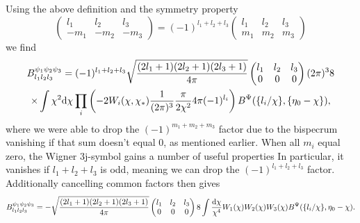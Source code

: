\documentclass[11pt]{article} %
\DeclareRobustCommand{\d}{\ifmmode\text{d}\else d\fi}
\newcommand{\br}[1]{\ensuremath{\left( #1 \right)}}
\begin{document}
Using the above definition and the symmetry property
\begin{equation*}
    \begin{pmatrix}
        l_1 & l_2 & l_3\\
        -m_1 & -m_2 & -m_3
      \end{pmatrix}
      =
      (-1)^{l_1+l_2+l_3}
      \begin{pmatrix}
        l_1 & l_2 & l_3\\
        m_1 & m_2 & m_3
      \end{pmatrix}
\end{equation*}
we find
\begin{gather*}
    B^{\psi_1\psi_2\psi_3}_{l_1l_2l_3}
    = (-1)^{l_1+l_2+l_3}
    \sqrt{\frac{(2l_1 + 1)(2l_2 + 1)(2l_3 + 1)}{4\pi}} \begin{pmatrix} l_1 & l_2 & l_3 \\ 0 & 0 & 0 \end{pmatrix}
    (2\pi)^3 8 \\
    \times \int \chi^2\d \chi\prod_i\br{-2 W_i(\chi, \chi_*)\frac{1}{(2\pi)^{3}}\frac{\pi}{2\chi^2}4\pi (-1)^{l_i}} B^\Psi(\{l_i/\chi\}, \{\eta_0-\chi\}),
\end{gather*}
where we were able to drop the $(-1)^{m_1+m_2+m_3}$ factor due to the bispecrum vanishing if that sum doesn't equal $0$, as mentioned earlier. When all $m_i$ equal zero, the Wigner 3j-symbol gains a number of useful properties %
In particular, it vanishes if $l_1+l_2+l_3$ is odd, meaning we can drop the $(-1)^{l_1+l_2+l_3}$ factor. Additionally cancelling common factors then gives
\begin{align*}
    B^{\psi_1\psi_2\psi_3}_{l_1l_2l_3}
    =
    -\sqrt{\frac{(2l_1 + 1)(2l_2 + 1)(2l_3 + 1)}{4\pi}} \begin{pmatrix} l_1 & l_2 & l_3 \\ 0 & 0 & 0 \end{pmatrix} 8 \int \frac{\d \chi }{\chi^4} W_1(\chi)W_2(\chi)W_3(\chi) B^\Psi(\{l_i/\chi\}, \eta_0-\chi).
\end{align*}
\end{document}
